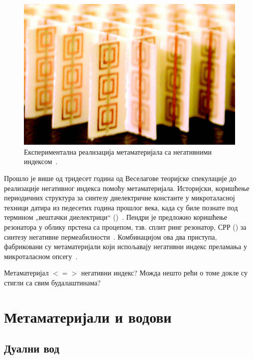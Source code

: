 \documentclass[12pt,oneside]{book}
\begin{document}
\begin{figure}[h]
    \centering
    \includegraphics[width=0.8\linewidth]{sl_uvod/mm_smit.jpg}
    \caption{Експериментална реализација метаматеријала са негативними индексом~\cite{smith:00}.}
    \label{uvod:mm_smit}
\end{figure}
Прошло је више од тридесет година од Веселагове теоријске спекулације до реализације негативног индекса помоћу метаматеријала. Историјски, коришћење периодичних структура за синтезу диелектричне константе у микроталасној техници датира из педесетих година прошлог века, када су биле познате под термином „вештачки диелектрици`` ()~\cite{rotman1962plasma}. Пендри је предложио коришћење резонатора у облику прстена са процепом, тзв. сплит ринг резонатор, СРР () за синтезу негативне пермеабилности~\cite{pendri:99}. Комбинацијом ова два приступа, фабриковани су метаматеријали који испољавају негативни индекс преламања у микроталасном опсегу~\cite{smith:00}.

Метаматеријал $<=>$ негативни индекс? Можда нешто рећи о томе докле су стигли са свим будалаштинама?

\section{Метаматеријали и водови}

\subsection{Дуални вод}
\end{document}
